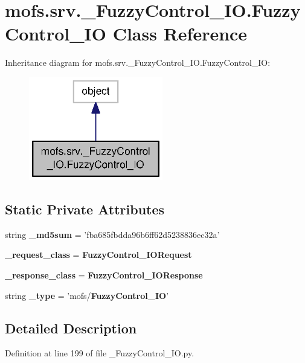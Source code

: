 \section{mofs.\-srv.\-\_\-\-Fuzzy\-Control\-\_\-\-I\-O.\-Fuzzy\-Control\-\_\-\-I\-O Class Reference}
\label{classmofs_1_1srv_1_1__FuzzyControl__IO_1_1FuzzyControl__IO}


Inheritance diagram for mofs.\-srv.\-\_\-\-Fuzzy\-Control\-\_\-\-I\-O.\-Fuzzy\-Control\-\_\-\-I\-O\-:\nopagebreak
\begin{figure}[H]
\begin{center}
\leavevmode
\includegraphics[width=166pt]{classmofs_1_1srv_1_1__FuzzyControl__IO_1_1FuzzyControl__IO__inherit__graph}
\end{center}
\end{figure}
\subsection*{Static Private Attributes}
\begin{DoxyCompactItemize}
\item 
string {\bf \-\_\-md5sum} = 'fba685fbdda96b6ff62d5238836ec32a'
\item 
{\bf \-\_\-request\-\_\-class} = {\bf Fuzzy\-Control\-\_\-\-I\-O\-Request}
\item 
{\bf \-\_\-response\-\_\-class} = {\bf Fuzzy\-Control\-\_\-\-I\-O\-Response}
\item 
string {\bf \-\_\-type} = 'mofs/{\bf Fuzzy\-Control\-\_\-\-I\-O}'
\end{DoxyCompactItemize}


\subsection{Detailed Description}


Definition at line 199 of file \-\_\-\-Fuzzy\-Control\-\_\-\-I\-O.\-py.



